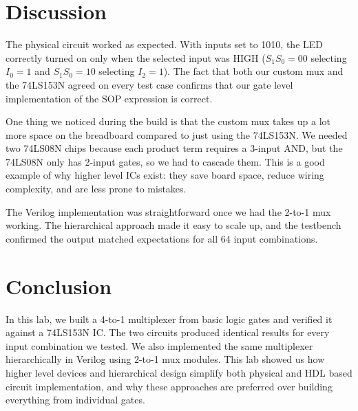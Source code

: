 \documentclass[12pt, letterpaper]{article}
\begin{document}
\section{Discussion}

The physical circuit worked as expected. With inputs set to 1010, the LED correctly turned on only when the selected input was HIGH ($S_1S_0 = 00$ selecting $I_0 = 1$ and $S_1S_0 = 10$ selecting $I_2 = 1$). The fact that both our custom mux and the 74LS153N agreed on every test case confirms that our gate level implementation of the SOP expression is correct.

One thing we noticed during the build is that the custom mux takes up a lot more space on the breadboard compared to just using the 74LS153N. We needed two 74LS08N chips because each product term requires a 3-input AND, but the 74LS08N only has 2-input gates, so we had to cascade them. This is a good example of why higher level ICs exist: they save board space, reduce wiring complexity, and are less prone to mistakes.

The Verilog implementation was straightforward once we had the 2-to-1 mux working. The hierarchical approach made it easy to scale up, and the testbench confirmed the output matched expectations for all 64 input combinations.

\section{Conclusion}

In this lab, we built a 4-to-1 multiplexer from basic logic gates and verified it against a 74LS153N IC. The two circuits produced identical results for every input combination we tested. We also implemented the same multiplexer hierarchically in Verilog using 2-to-1 mux modules. This lab showed us how higher level devices and hierarchical design simplify both physical and HDL based circuit implementation, and why these approaches are preferred over building everything from individual gates.
\end{document}
